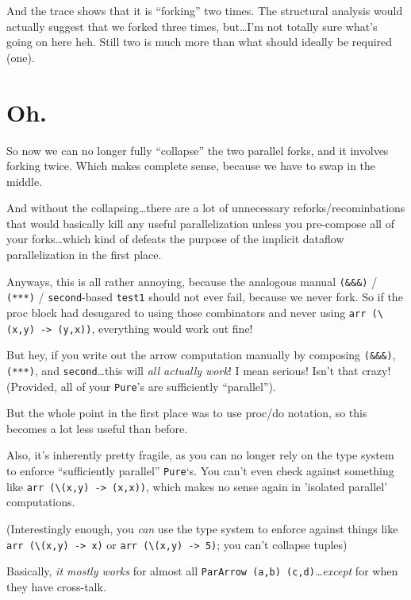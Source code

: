 \documentclass[]{article}
\begin{document}
And the trace shows that it is ``forking'' two times. The structural analysis
would actually suggest that we forked three times, but\ldots I'm not totally
sure what's going on here heh. Still two is much more than what should ideally
be required (one).

\hypertarget{oh.}{%
\section{Oh.}\label{oh.}}

So now we can no longer fully ``collapse'' the two parallel forks, and it
involves forking twice. Which makes complete sense, because we have to swap in
the middle.

And without the collapsing\ldots there are a lot of unnecessary
reforks/recominbations that would basically kill any useful parallelization
unless you pre-compose all of your forks\ldots which kind of defeats the purpose
of the implicit dataflow parallelization in the first place.

Anyways, this is all rather annoying, because the analogous manual
\texttt{(\&\&\&)} / \texttt{(***)} / \texttt{second}-based \texttt{test1} should
not ever fail, because we never fork. So if the proc block had desugared to
using those combinators and never using
\texttt{arr\ (\textbackslash{}(x,y)\ -\textgreater{}\ (y,x))}, everything would
work out fine!

But hey, if you write out the arrow computation manually by composing
\texttt{(\&\&\&)}, \texttt{(***)}, and \texttt{second}\ldots this will \emph{all
actually work}! I mean serious! Isn't that crazy! (Provided, all of your
\texttt{Pure}'s are sufficiently ``parallel'').

But the whole point in the first place was to use proc/do notation, so this
becomes a lot less useful than before.

Also, it's inherently pretty fragile, as you can no longer rely on the type
system to enforce ``sufficiently parallel'' \texttt{Pure}`s. You can't even
check against something like
\texttt{arr\ (\textbackslash{}(x,y)\ -\textgreater{}\ (x,x))}, which makes no
sense again in 'isolated parallel' computations.

(Interestingly enough, you \emph{can} use the type system to enforce against
things like \texttt{arr\ (\textbackslash{}(x,y)\ -\textgreater{}\ x)} or
\texttt{arr\ (\textbackslash{}(x,y)\ -\textgreater{}\ 5)}; you can't collapse
tuples)

Basically, \emph{it mostly works} for almost all
\texttt{ParArrow\ (a,b)\ (c,d)}\ldots{}\emph{except} for when they have
cross-talk.
\end{document}
